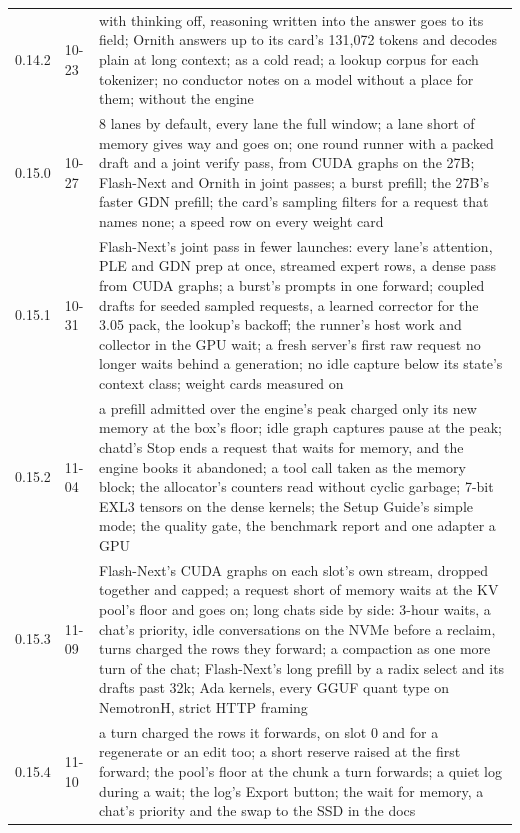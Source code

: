 \begin{table}[htbp]
\begin{tabularx}{\linewidth}{@{}L{.2\linewidth}L{.15\linewidth}Y@{}}
0.14.2 & 10-23 & with thinking off, reasoning written into the answer goes to its field; Ornith answers up to its card's 131,072 tokens and decodes plain at long context;  as a cold read; a lookup corpus for each tokenizer; no conductor notes on a model without a place for them;  without the engine \\
0.15.0 & 10-27 & 8 lanes by default, every lane the full window; a lane short of memory gives way and goes on; one round runner with a packed draft and a joint verify pass, from CUDA graphs on the 27B; Flash-Next and Ornith in joint passes; a burst prefill; the 27B's faster GDN prefill; the card's sampling filters for a request that names none; a speed row on every weight card \\
0.15.1 & 10-31 & Flash-Next's joint pass in fewer launches: every lane's attention, PLE and GDN prep at once, streamed expert rows, a dense pass from CUDA graphs; a burst's prompts in one forward; coupled drafts for seeded sampled requests, a learned corrector for the 3.05 pack, the lookup's backoff; the runner's host work and collector in the GPU wait; a fresh server's first raw request no longer waits behind a generation; no idle capture below its state's context class; weight cards measured on  \\
0.15.2 & 11-04 & a prefill admitted over the engine's peak charged only its new memory at the box's floor; idle graph captures pause at the peak; chatd's Stop ends a request that waits for memory, and the engine books it abandoned; a  tool call taken as the memory block; the allocator's counters read without cyclic garbage; 7-bit EXL3 tensors on the dense kernels; the Setup Guide's simple mode; the quality gate, the benchmark report and one adapter a GPU \\
0.15.3 & 11-09 & Flash-Next's CUDA graphs on each slot's own stream, dropped together and capped; a request short of memory waits at the KV pool's floor and goes on; long chats side by side: 3-hour waits, a chat's priority, idle conversations on the NVMe before a reclaim, turns charged the rows they forward; a compaction as one more turn of the chat; Flash-Next's long prefill by a radix select and its drafts past 32k; Ada kernels, every GGUF quant type on NemotronH, strict HTTP framing \\
0.15.4 & 11-10 & a turn charged the rows it forwards, on slot 0 and for a regenerate or an edit too; a short reserve raised at the first forward; the pool's floor at the chunk a turn forwards; a quiet log during a wait; the log's Export button; the wait for memory, a chat's priority and the swap to the SSD in the docs \\
\bottomrule
\end{tabularx}
\end{table}

